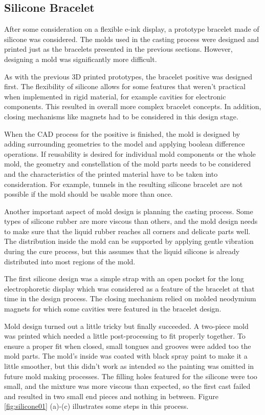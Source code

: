 \subsection{Silicone Bracelet}
After some consideration on a flexible e-ink display, a prototype brace\-let made of silicone was considered. The molds used in the casting process were designed and printed just as the bracelets presented in the previous sections. However, designing a mold was significantly more difficult.

As with the previous 3D printed prototypes, the bracelet positive was designed first. The flexibility of silicone allows for some features that weren't practical when implemented in rigid material, for example cavities for electronic components. This resulted in overall more complex bracelet concepts. In addition, closing mechanisms like magnets had to be considered in this design stage.

When the \ac{CAD} process for the positive is finished, the mold is designed by adding surrounding geometries to the model and applying boolean difference operations. If reusability is desired for individual mold components or the whole mold, the geometry and constellation of the mold parts needs to be considered and the characteristics of the printed material have to be taken into consideration. For example, tunnels in the resulting silicone bracelet are not possible if the mold should be usable more than once.

Another important aspect of mold design is planning the casting process. Some types of silicone rubber are more viscous than others, and the mold design needs to make sure that the liquid rubber reaches all corners and delicate parts well. The distribution inside the mold can be supported by applying gentle vibration during the cure process, but this assumes that the liquid silicone is already distributed into most regions of the mold.

The first silicone design was a simple strap with an open pocket for the long electrophoretic display which was considered as a feature of the bracelet at that time in the design process. The closing mechanism relied on molded neodymium magnets for which some cavities were featured in the bracelet design.

Mold design turned out a little tricky but finally succeeded. A two-piece mold was printed which needed a little post-processing to fit properly together. To ensure a proper fit when closed, small tongues and grooves were added too the mold parts. The mold's inside was coated with black spray paint to make it a little smoother, but this didn't work as intended so the painting was omitted in future mold making processes. The filling holes featured for the silicone were too small, and the mixture was more viscous than expected, so the first cast failed and resulted in two small end pieces and nothing in between. Figure \ref{fig:silicone01} (a)-(c) illustrates some steps in this process.

